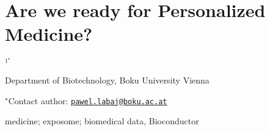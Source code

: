 \documentclass[\main/boa.tex]{subfiles}
\begin{document}
\section{Are we ready for Personalized Medicine?}

\begin{center}
  {\bf {}$^{1^\star}$}
\end{center}

\vskip 0.3cm

\begin{affiliations}
\begin{enumerate}
\begin{minipage}{0.915\textwidth}
\centering
\item Department of Biotechnology, Boku University Vienna \\[-2pt]
\end{minipage}
\end{enumerate}
$^\star$Contact author: \href{mailto:pawel.labaj@boku.ac.at}{\nolinkurl{pawel.labaj@boku.ac.at}}\\
\end{affiliations}

\vskip 0.5cm

\begin{minipage}{0.915\textwidth}
\keywords medicine; exposome; biomedical data, Bioconductor
\end{minipage}

\vskip 0.8cm
\end{document}
